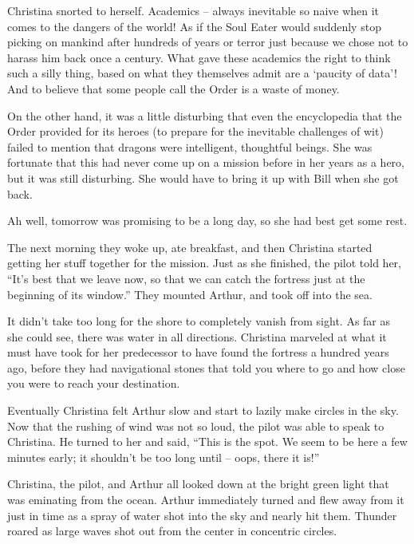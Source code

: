 \documentclass[showtrims,b6paper,draft,10pt]{memoir}
\begin{document}
Christina snorted to herself.  Academics -- always inevitable so naive when it comes to the dangers of the world!  As if the Soul Eater would suddenly stop picking on mankind after hundreds of years or terror just because we chose not to harass him back once a century.  What gave these academics the right to think such a silly thing, based on what they themselves admit are a `paucity of data'!  And to believe that some people call the Order is a waste of money.

On the other hand, it was a little disturbing that even the encyclopedia that the Order provided for its heroes (to prepare for the inevitable challenges of wit) failed to mention that dragons were intelligent, thoughtful beings.  She was fortunate that this had never come up on a mission before in her years as a hero, but it was still disturbing.  She would have to bring it up with Bill when she got back.

Ah well, tomorrow was promising to be a long day, so she had best get some rest.

\timeskip

The next morning they woke up, ate breakfast, and then Christina started getting her stuff together for the mission.  Just as she finished, the pilot told her, ``It's best that we leave now, so that we can catch the fortress just at the beginning of its window.''  They mounted Arthur, and took off into the sea.

It didn't take too long for the shore to completely vanish from sight.  As far as she could see, there was water in all directions.  Christina marveled at what it must have took for her predecessor to have found the fortress a hundred years ago, before they had navigational stones that told you where to go and how close you were to reach your destination.

Eventually Christina felt Arthur slow and start to lazily make circles in the sky.  Now that the rushing of wind was not so loud, the pilot was able to speak to Christina.  He turned to her and said, ``This is the spot.  We seem to be here a few minutes early;  it shouldn't be too long until -- oops, there it is!''

Christina, the pilot, and Arthur all looked down at the bright green light that was eminating from the ocean.  Arthur immediately turned and flew away from it just in time as a spray of water shot into the sky and nearly hit them.  Thunder roared as large waves shot out from the center in concentric circles.
\end{document}
